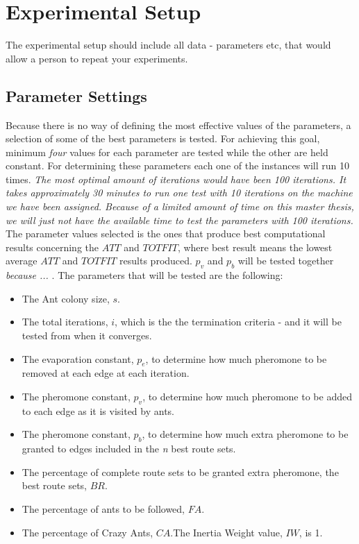 \section{Experimental Setup}

The experimental setup should include all data - parameters etc, that would allow a person to repeat your experiments. 
 
\subsection{Parameter Settings}
\label{subsec:parameterSettings_setup}

Because there is no way of defining the most effective values of the parameters, a selection of some of the best parameters is tested. For achieving this goal, minimum \textit{four} values for each parameter are tested while the other are held constant. For determining these parameters each one of the instances will run 10 times. \textit{The most optimal amount of iterations would have been 100 iterations. It takes approximately 30 minutes to run one test with 10 iterations on the machine we have been assigned. Because of a limited amount of time on this master thesis, we will just not have the available time to test the parameters with 100 iterations.} The parameter values selected is the ones that produce best computational results concerning the $ATT$ and $TOTFIT$, where best result means the lowest average $ATT$ and $TOTFIT$ results produced. $p_{v}$ and $p_{b}$ will be tested together \emph{\color{red}because ... }. The parameters that will be tested are the following:

\begin{itemize}
\item The Ant colony size, $s$.
\item The total iterations, $i$, which is the the termination criteria - and it will be tested from when it converges. 
\item The evaporation constant, $p_{e}$, to determine how much pheromone to be removed at each edge at each iteration. 
\item The pheromone constant, $p_{v}$, to determine how much pheromone to be added to each edge as it is visited by ants. 
\item The pheromone constant, $p_{b}$, to determine how much extra pheromone to be granted to edges included in the \textit{n} best route sets.
\item The percentage of complete route sets to be granted extra pheromone, the best route sets, $BR$.
\item The percentage of ants to be followed, $FA$.
\item The percentage of Crazy Ants, $CA$.The Inertia Weight value, $IW$, is 1.
\end{itemize}

